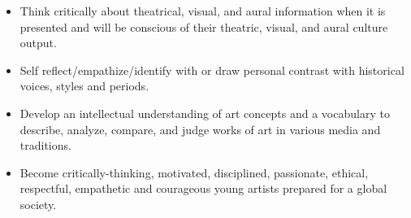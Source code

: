\begin{itemize}
\item Think critically about theatrical, visual, and aural information when it is presented and will be conscious of their theatric, visual, and aural culture output.
\item Self reflect/empathize/identify with or draw personal contrast with historical voices, styles and periods.
\item Develop an intellectual understanding of art concepts and a vocabulary to describe, analyze, compare, and judge works of art in various media and traditions.
\item Become critically-thinking, motivated, disciplined, passionate, ethical, respectful, empathetic and courageous young artists prepared for a global society.

\end{itemize}